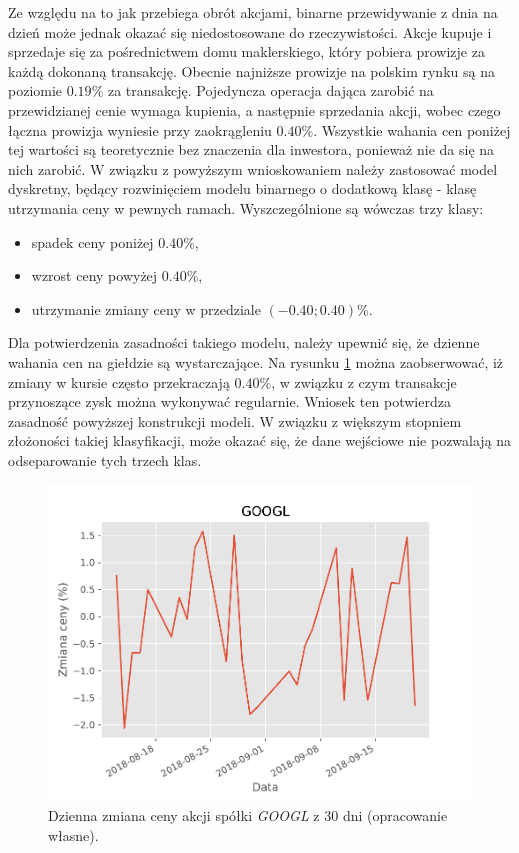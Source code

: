 \documentclass[a4paper, twoside, 11pt, openright]{article}
\begin{document}
Ze względu na to jak przebiega obrót akcjami, binarne przewidywanie z dnia na dzień może jednak okazać się niedostosowane do rzeczywistości. Akcje kupuje i sprzedaje się za pośrednictwem domu maklerskiego, który pobiera prowizje za każdą dokonaną transakcję. Obecnie najniższe prowizje na polskim rynku są na poziomie $0.19\%$ za transakcję. Pojedyncza operacja dająca zarobić na przewidzianej cenie wymaga kupienia, a następnie sprzedania akcji, wobec czego łączna prowizja wyniesie przy zaokrągleniu $0.40\%$. Wszystkie wahania cen poniżej tej wartości są teoretycznie bez znaczenia dla inwestora, ponieważ nie da się na nich zarobić. W związku z powyższym wnioskowaniem należy zastosować model dyskretny, będący rozwinięciem modelu binarnego o dodatkową klasę - klasę utrzymania ceny w pewnych ramach. Wyszczególnione są wówczas trzy klasy:
\begin{itemize}
\item spadek ceny poniżej $0.40\%$,
\item wzrost ceny powyżej $0.40\%$,
\item utrzymanie zmiany ceny w przedziale $(-0.40; 0.40)\%$.
\end{itemize}

Dla potwierdzenia zasadności takiego modelu, należy upewnić się, że dzienne wahania cen na giełdzie są wystarczające. Na rysunku \ref{img:googl_pct_change_last_30} można zaobserwować, iż zmiany w kursie często przekraczają $0.40\%$, w związku z czym transakcje przynoszące zysk można wykonywać regularnie. Wniosek ten potwierdza zasadność powyższej konstrukcji modeli. W związku z większym stopniem złożoności takiej klasyfikacji, może okazać się, że dane wejściowe nie pozwalają na odseparowanie tych trzech klas. 

\begin{figure}[H]
\centering \includegraphics[scale=0.9]{img/googl_pct_change_last_30}
\caption{Dzienna zmiana ceny akcji spółki \textit{GOOGL} z 30 dni (opracowanie własne).}
\label{img:googl_pct_change_last_30}
\end{figure}
\end{document}
